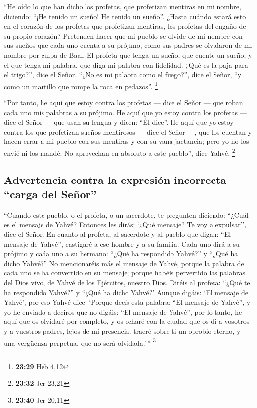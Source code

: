 \begin{paracol}{2}
 ``He oído lo que han dicho los profetas, que profetizan
mentiras en mi nombre, diciendo: ``¡He tenido un sueño! He tenido un
sueño''.  ¿Hasta cuándo estará esto en el corazón de los
profetas que profetizan mentiras, los profetas del engaño de su propio
corazón?  Pretenden hacer que mi pueblo se olvide de mi
nombre con sus sueños que cada uno cuenta a su prójimo, como sus padres
se olvidaron de mi nombre por culpa de Baal.  El profeta
que tenga un sueño, que cuente un sueño; y el que tenga mi palabra, que
diga mi palabra con fidelidad. ¿Qué es la paja para el trigo?'', dice el
Señor.  ``¿No es mi palabra como el fuego?'', dice el
Señor, ``y como un martillo que rompe la roca en pedazos''. \footnote{\textbf{23:29}
  Heb 4,12}

 ``Por tanto, he aquí que estoy contra los profetas ---
dice el Señor --- que roban cada uno mis palabras a su prójimo.
 He aquí que yo estoy contra los profetas --- dice el
Señor --- que usan su lengua y dicen: ``Él dice''.  He
aquí que yo estoy contra los que profetizan sueños mentirosos --- dice
el Señor ---, que los cuentan y hacen errar a mi pueblo con sus mentiras
y con su vana jactancia; pero yo no los envié ni los mandé. No
aprovechan en absoluto a este pueblo'', dice Yahvé. \footnote{\textbf{23:32}
  Jer 23,21}

\hypertarget{advertencia-contra-la-expresiuxf3n-incorrecta-carga-del-seuxf1or}{%
\subsection{Advertencia contra la expresión incorrecta ``carga del
Señor''}\label{advertencia-contra-la-expresiuxf3n-incorrecta-carga-del-seuxf1or}}

 ``Cuando este pueblo, o el profeta, o un sacerdote, te
pregunten diciendo: ``¿Cuál es el mensaje de Yahvé? Entonces les dirás:
`¿Qué mensaje? Te voy a expulsar'', dice el Señor.  En
cuanto al profeta, al sacerdote y al pueblo que digan: ``El mensaje de
Yahvé'', castigaré a ese hombre y a su familia.  Cada uno
dirá a su prójimo y cada uno a su hermano: ``¿Qué ha respondido Yahvé?''
y ``¿Qué ha dicho Yahvé?''  No mencionaréis más el
mensaje de Yahvé, porque la palabra de cada uno se ha convertido en su
mensaje; porque habéis pervertido las palabras del Dios vivo, de Yahvé
de los Ejércitos, nuestro Dios.  Diréis al profeta:
``¿Qué te ha respondido Yahvé?'' y ``¿Qué ha dicho Yahvé?'
 Aunque digáis: `El mensaje de Yahvé', por eso Yahvé
dice: `Porque decís esta palabra: ``El mensaje de Yahvé'', y yo he
enviado a deciros que no digáis: ``El mensaje de Yahvé'',
 por lo tanto, he aquí que os olvidaré por completo, y os
echaré con la ciudad que os di a vosotros y a vuestros padres, lejos de
mi presencia.  traeré sobre ti un oprobio eterno, y una
vergüenza perpetua, que no será olvidada.'\,'' \footnote{\textbf{23:40}
  Jer 20,11}


\end{paracol}
